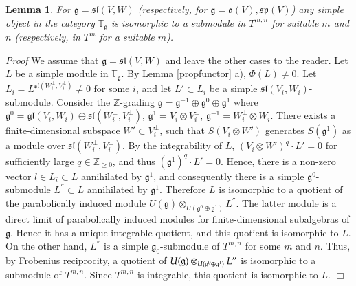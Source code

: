 \documentclass[10pt]{amsart}
\newcounter{theorem}
\newtheorem{lemma}[theo]{Lemma}
\renewenvironment{proof}{ \emph{Proof}}{$\Box$}
\newcommand {\ZZ} {\mathbb {Z}}
\newcommand{\TT}{\mathbb{T}}
\renewcommand{\sp}{\mathfrak{sp}}
\renewcommand{\sl}{\mathfrak{sl}}
\newcommand{\oo}{\mathfrak{o}}
\renewcommand{\gg}{\mathfrak{g}}
\newcommand{\gl}{\mathfrak{gl}}
\begin{document}
\vspace{0.33cm}
\begin{lemma}\label{tensor} For $\gg = \sl(V,W)$ (respectively, for  $\gg = \oo(V), \sp(V)$) 
any simple object in the category $\TT_\gg$ is isomorphic to a
submodule in $T^{m,n}$ for suitable $m$ and $n$ 
(respectively, in $T^m$ for a suitable $m$).
\end{lemma}
\begin{proof} We assume that $\gg = \sl(V,W)$ and leave the other cases to the reader. 
Let $L$ be a simple module in $\TT_\gg$. By Lemma \ref{propfunctor}
a), 
$\Phi(L)\neq 0$. Let $L_i = L^{\sl(W_i^{\perp},V_i^{\perp})}\neq0$ for
some $i$, and let $L'\subset L_i$ be a simple $\sl(V_i,W_i)$-submodule. Consider the $\ZZ$-grading
$\gg=\gg^{-1}\oplus\gg^0\oplus\gg^1$ where 
$\gg^0=\gl(V_i,W_i)\oplus \sl(W_i^\perp,V_i^\perp)$, $\gg^1=V_i\otimes V_i^\perp$,  
$\gg^{-1}=W_i^\perp\otimes W_i$. There exists a finite-dimensional
subspace $W'\subset V_i^\perp$, such that 
$S(V_i\otimes W')$ generates $S(\gg^1)$ as a module over
$\sl(W_i^\perp,V_i^\perp)$. By the integrability of $L$, 
$(V_i\otimes W')^q\cdot L'=0$ for sufficiently large $q\in \ZZ_{\geq  0}$, and thus 
$(\gg^1)^q\cdot L'=0$. Hence, there is a non-zero vector $l\in L_i
\subset L$ annihilated by $\gg^1$, and consequently 
there is a simple $\gg^0$-submodule $L^{''} \subset L$ annihilated by
$\gg^1$. 
Therefore $L$ is isomorphic to a quotient of the parabolically induced module 
$U(\gg)\otimes_{U(\gg^0\oplus\gg^1)}L^{''}$. The latter module is a direct limit of 
parabolically induced modules for finite-dimensional subalgebras of
$\gg$. 
Hence it has a unique integrable quotient, and this quotient is
isomorphic to $L$. 
On the other hand, $L^{''}$ is a simple $\gg_0$-submodule of $T^{m,n}$
for some $m$ and $n$. 
Thus, by Frobenius reciprocity, a quotient of $U(\gg)\otimes_{U(\gg^0\oplus \gg^1)}L"$ is isomorphic to a submodule of $T^{m,n}$. Since $T^{m,n}$ is integrable, this quotient is isomorphic to $L$. 
\end{proof}
\end{document}
